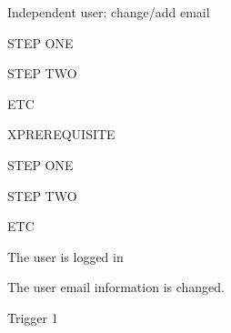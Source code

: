 \begin{uc}{Independent user: change/add email}

    \begin{uc-mss}
    \item STEP ONE
    \item STEP TWO
    \item ETC
    \end{uc-mss}

    \begin{uc-ext}

        \begin{uc-fail}{X}{PREREQUISITE}
        \item STEP ONE
        \item STEP TWO
        \item ETC
        \end{uc-fail}

    \end{uc-ext}

    \begin{uc-pre}
    \item The user is logged in
    \end{uc-pre}

    \begin{uc-post}
    \item The user email information is changed.
    \end{uc-post}

    \begin{uc-trig}
    \item Trigger 1
    \end{uc-trig}

\end{uc}